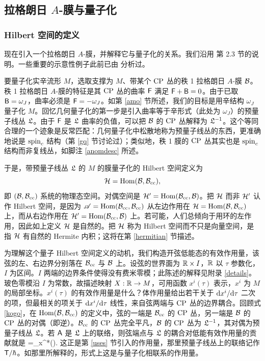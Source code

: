 \subsection{拉格朗日 $A$-膜与量子化}\label{abq}

\subsubsection{Hilbert 空间的定义}\label{hilbdef}

现在引入一个拉格朗日 $A$-膜，并解释它与量子化的关系。我们沿用 \cite{GW} 第 2.3 节的说明。一些重要的示意性例子此前已由 \cite{AZ} 分析过。

要量子化实辛流形 $M$，选取支撑为 $M$、带某个 ${\mathrm{CP}}$ 丛的秩 1 拉格朗日 $A$-膜 ${\mathcal B}$。秩 1 拉格朗日 $A$-膜的特征是其 ${\mathrm{CP}}$ 丛的曲率 ${\sf F}$ 满足 ${\sf F}+{\sf B}=0$。由于已取 ${\sf B}=\omega_J$，曲率必须是 ${\sf F}=-\omega_J$。如第 \ref{amo} 节所述，我们的目标是用辛结构 $\omega_J$ 量子化 $M$。回忆几何量子化的第一步是引入曲率等于辛形式（此处为 $\omega_J$）的预量子线丛 ${\mathfrak L}$。由于 ${\sf F}$ 是 ${\mathfrak L}$ 曲率的负值，可以把 ${\mathcal B}$ 的 ${\mathrm{CP}}$ 丛解释为 ${\mathfrak L}^{-1}$。这个等同合理的一个迹象是反常匹配：几何量子化中松散地称为预量子线丛的东西，更准确地说是 ${\mathrm{spin}_c}$ 结构（第 \ref{gq} 节讨论过）；类似地，秩 1 膜的 ${\mathrm{CP}}$ 丛其实也是 ${\mathrm{spin}_c}$ 结构而非复线丛，如脚注 \ref{anomdesc} 所述。

于是，带预量子线丛 ${\mathfrak L}$ 的 $M$ 的膜量子化的 Hilbert 空间定义为
\[
{\mathcal H}={\mathrm{Hom}}({\mathcal B},{\mathcal B}_{\mathrm{cc}}),
\]
即 $({\mathcal B},{\mathcal B}_{\mathrm{cc}})$ 系统的物理态空间。对偶空间是 ${\mathcal H}'={\mathrm{Hom}}({\mathcal B}_{\mathrm{cc}},{\mathcal B})$。把 ${\mathcal H}$ 而非 ${\mathcal H}'$ 认作 Hilbert 空间，是因为 ${\mathscr A}={\mathrm{Hom}}({\mathcal B}_{\mathrm{cc}},{\mathcal B}_{\mathrm{cc}})$ 从左边作用在 ${\mathcal H}={\mathrm{Hom}}({\mathcal B},{\mathcal B}_{\mathrm{cc}})$ 上，而从右边作用在 ${\mathcal H}'={\mathrm{Hom}}({\mathcal B}_{\mathrm{cc}},{\mathcal B})$ 上。若可能，人们总倾向于用环的左作用，因此如上定义 ${\mathcal H}$ 是自然的。把 ${\mathcal H}$ 称为 Hilbert 空间而不只是向量空间，是指 ${\mathcal H}$ 有自然的 Hermite 内积；这将在第 \ref{hermitian} 节描述。

为理解这个量子 Hilbert 空间定义的动机，我们构造开弦低能态的有效作用量，该弦的左、右边界分别落在 ${\mathcal B}_{\mathrm{cc}}$ 与 ${\mathcal B}$ 上。设弦的世界面为 ${\mathbb R}\times I$，${\mathbb R}$ 以 $\tau$ 参数化，$I$ 为区间。$I$ 两端的边界条件使得没有费米零模；此陈述的解释见附录 \ref{details}。玻色零模沿 $I$ 为常数，故描述映射 $X:{\mathbb R}\to M$，可用函数 $x^i(\tau)$ 表示，$x^i$ 为 $M$ 的局部坐标。$x^i(\tau)$ 的有效作用量是什么？体作用量给出若干关于 ${\mathrm d} x^i/{\mathrm d}\tau$ 二次的项，但最相关的项关于 ${\mathrm d} x^i/{\mathrm d}\tau$ 线性，来自弦两端与 ${\mathrm{CP}}$ 丛的边界耦合。回顾式 \eqref{kogo}，在 ${\mathrm{Hom}}({\mathcal B},{\mathcal B}_{\mathrm{cc}})$ 的定义中，弦的一端是 ${\mathcal B}_{\mathrm{cc}}$ 的 ${\mathrm{CP}}$ 丛，另一端是 ${\mathcal B}$ 的 ${\mathrm{CP}}$ 丛的对偶（即逆）。${\mathcal B}_{\mathrm{cc}}$ 的 ${\mathrm{CP}}$ 丛完全平凡，${\mathcal B}$ 的 ${\mathrm{CP}}$ 丛为 ${\mathfrak L}^{-1}$，其对偶为预量子线丛 ${\mathfrak L}$。若 ${\sf A}$ 是 ${\mathfrak L}$ 上的联络，则弦端点与 ${\mathfrak L}$ 的耦合对低能有效作用量的贡献就是
\be\label{kixx}\sI=\int_\R x^*(\sA).\ee
这正是第 \ref{uses} 节引入的作用量，那里预量子线丛上的联络记作 ${\sf T}/\hbar$。如那里所解释的，形式上这是与量子化相联系的作用量。

